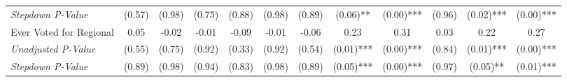 \begin{tabular}{l c c c c c c c c c c c}
\quad \textit{Stepdown P-Value} & (0.57) & (0.98) & (0.75) & (0.88) & (0.98) & (0.89) & (0.06)** & (0.00)*** & (0.96) & (0.02)*** & (0.00)*** \\
Ever Voted for Regional & 0.05 & -0.02 & -0.01 & -0.09 & -0.01 & -0.06 & 0.23 & 0.31 & 0.03 & 0.22 & 0.27 \\
\quad \textit{Unadjusted P-Value} & (0.55) & (0.75) & (0.92) & (0.33) & (0.92) & (0.54) & (0.01)*** & (0.00)*** & (0.84) & (0.01)*** & (0.00)*** \\
\quad \textit{Stepdown P-Value} & (0.89) & (0.98) & (0.94) & (0.83) & (0.98) & (0.89) & (0.05)*** & (0.00)*** & (0.97) & (0.05)** & (0.01)*** \\
\bottomrule
\end{tabular}
